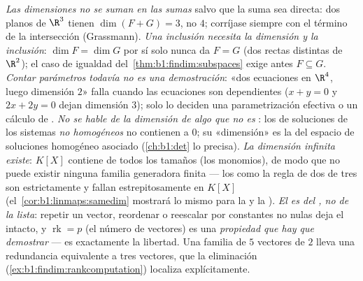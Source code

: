 \begin{remark}
\label{rem:b1:findim:pitfalls}
\emph{Las dimensiones no se suman en las sumas} salvo que la suma sea
directa: dos planos de $\R^3$ tienen $\dim(F + G) = 3$, no $4$;
corríjase siempre con el término de la intersección (Grassmann).
\emph{Una inclusión necesita la dimensión \emph{y} la inclusión}:
$\dim F = \dim G$ por sí solo nunca da $F = G$ (dos rectas distintas
de $\R^2$); el caso de igualdad
del~\cref{thm:b1:findim:subspaces} exige antes $F \subseteq G$.
\emph{Contar parámetros todavía no es una demostración}: «dos
ecuaciones en $\R^4$, luego dimensión $2$» falla cuando las
ecuaciones son dependientes ($x + y = 0$ y $2x + 2y = 0$ dejan
dimensión $3$); solo lo deciden una parametrización efectiva o un
cálculo de .
\emph{No se hable de la dimensión de algo que no es }: los
 de soluciones de los sistemas \emph{no homogéneos} no
contienen a $0$; su «dimensión» es la del espacio de soluciones
homogéneo asociado (\cref{ch:b1:det} lo precisa).
\emph{La dimensión infinita existe}: $K[X]$ contiene  de todos los tamaños (los monomios), de modo que no puede
existir ninguna familia generadora finita --- los  como la
regla de dos de tres son estrictamente  y fallan
estrepitosamente en $K[X]$ (el~\cref{cor:b1:linmaps:samedim} mostrará
lo mismo para la  y la ).
\emph{El  es del , no de la lista}:
repetir un vector, reordenar o reescalar por constantes no nulas deja
el  intacto, y $\operatorname{rk} = p$ (el número de vectores)
es una \emph{propiedad que hay que demostrar} --- es exactamente la
libertad. Una familia de $5$ vectores de  $2$ lleva una
redundancia equivalente a tres vectores, que la eliminación
(\cref{ex:b1:findim:rankcomputation}) localiza explícitamente.
\end{remark}

